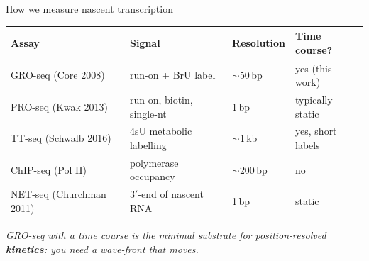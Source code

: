 \documentclass[aspectratio=169,11pt]{beamer}
\newcommand{\goldbf}[1]{{\color{KGold}\bfseries #1}}
\begin{document}
\begin{frame}{How we measure nascent transcription}
\vspace{0.4em}
\begin{center}
\renewcommand{\arraystretch}{1.25}
\begin{tabular}{@{}l l l l@{}}
\toprule
{\color{KGold}\bfseries Assay} & {\color{KCream}\footnotesize Signal} &
{\color{KCream}\footnotesize Resolution} & {\color{KCream}\footnotesize Time course?} \\
\midrule
{\color{KWhite}GRO-seq (Core 2008)}     & {\color{KWhite}run-on + BrU label}         & {\color{KWhite}$\sim$50\,bp} & {\color{KWhite}yes (this work)} \\
{\color{KWhite}PRO-seq (Kwak 2013)}     & {\color{KWhite}run-on, biotin, single-nt} & {\color{KWhite}1\,bp} & {\color{KWhite}typically static} \\
{\color{KWhite}TT-seq (Schwalb 2016)}   & {\color{KWhite}4sU metabolic labelling}   & {\color{KWhite}$\sim$1\,kb}  & {\color{KWhite}yes, short labels} \\
{\color{KWhite}ChIP-seq (Pol II)}       & {\color{KWhite}polymerase occupancy}      & {\color{KWhite}$\sim$200\,bp}& {\color{KWhite}no} \\
{\color{KWhite}NET-seq (Churchman 2011)}& {\color{KWhite}3$'$-end of nascent RNA}    & {\color{KWhite}1\,bp} & {\color{KWhite}static} \\
\bottomrule
\end{tabular}
\end{center}
\vspace{0.7em}
\begin{center}
  {\color{KCream}\itshape
  GRO-seq with a time course is the minimal substrate for position-resolved
  \goldbf{kinetics}: you need a wave-front that moves.}
\end{center}
\end{frame}
\end{document}
